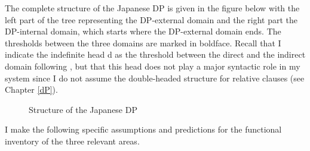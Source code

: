 \documentclass [output=book,colorlinks,citecolor=brown]{langscibook}
\begin{document}
The complete structure of the Japanese DP is given in the figure below with the left part of the tree representing the DP-external domain and the right part the DP-internal domain, which starts where the DP-external domain ends. The thresholds between the three domains are marked in boldface. Recall that I indicate the indefinite head d as the threshold between the direct and the indirect domain following \citet{cinque:2010:adj, cinque:2020:relcl}, but that this head does not play a major syntactic role in my system since I do not assume the double-headed structure for relative clauses (see Chapter \ref{dP}).

\newpage

\begin{figure}
 \centering
 \begin{subfigure}{0.5\textwidth}
 \centering
 \end{subfigure}%
 \begin{subfigure}{0.5\textwidth}
 \centering
 \end{subfigure}
 \caption{Structure of the Japanese DP}
 \label{fig:Structure of the Japanese DP2}
\end{figure}


I make the following specific assumptions and predictions for the functional inventory of the three relevant areas.
\end{document}
